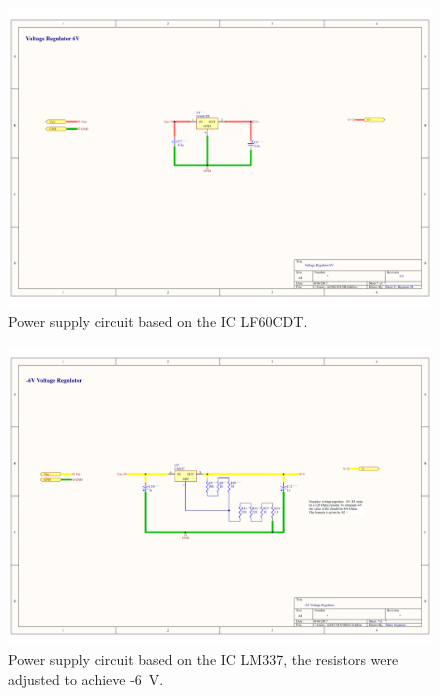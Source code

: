 \begin{landscape}
	\begin{figure}[!htpb]
		\centering
		\includegraphics[width=0.9\paperwidth,keepaspectratio]{DGA_PS_6}
		\caption[Positive power supply (\SI{6}{\volt}) for the differential amplifier]{Power supply circuit based on the IC LF60CDT.}
		\label{fig:DGA PS 6}
	\end{figure}
\end{landscape}

\begin{landscape}
	\begin{figure}[!htpb]
		\centering
		\includegraphics[width=0.9\paperwidth,keepaspectratio]{DGA_PS_N6}
		\caption[Negative power supply (\SI{-6}{\volt}) for the differential amplifier]{Power supply circuit based on the IC LM337, the resistors were adjusted to achieve -\SI{6}{\volt}.}
		\label{fig:DGA PS -6}
	\end{figure}
\end{landscape}

